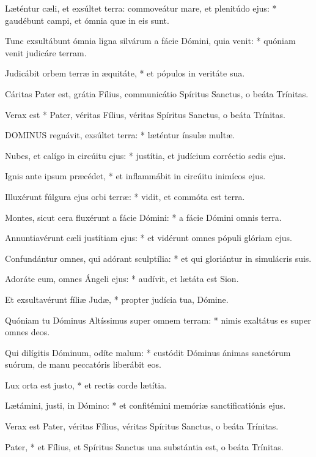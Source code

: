 Læténtur cæli, et exsúltet terra: commoveátur mare, et plenitúdo ejus: * gaudébunt campi, et ómnia quæ in eis sunt.

Tunc exsultábunt ómnia ligna silvárum a fácie Dómini, quia venit: * quóniam venit judicáre terram.

Judicábit orbem terræ in æquitáte, * et pópulos in veritáte sua.

 Cáritas Pater est, grátia Fílius, communicátio Spíritus Sanctus, o beáta Trínitas.

 Verax est * Pater, véritas Fílius, véritas Spíritus Sanctus, o beáta Trínitas.


\lettrine[lines=2]{D}{OMINUS} regnávit, exsúltet terra: * læténtur ínsulæ multæ.

Nubes, et calígo in circúitu ejus: * justítia, et judícium corréctio sedis ejus.

Ignis ante ipsum præcédet, * et inflammábit in circúitu inimícos ejus.

Illuxérunt fúlgura ejus orbi terræ: * vidit, et commóta est terra.

Montes, sicut cera fluxérunt a fácie Dómini: * a fácie Dómini omnis terra.

Annuntiavérunt cæli justítiam ejus: * et vidérunt omnes pópuli glóriam ejus.

Confundántur omnes, qui adórant sculptília: * et qui gloriántur in simulácris suis.

Adoráte eum, omnes Ángeli ejus: * audívit, et lætáta est Sion.

Et exsultavérunt fíliæ Judæ, * propter judícia tua, Dómine.

Quóniam tu Dóminus Altíssimus super omnem terram: * nimis exaltátus es super omnes deos.

Qui dilígitis Dóminum, odíte malum: * custódit Dóminus ánimas sanctórum suórum, de manu peccatóris liberábit eos.

Lux orta est justo, * et rectis corde lætítia.

Lætámini, justi, in Dómino: * et confitémini memóriæ sanctificatiónis ejus.

 Verax est Pater, véritas Fílius, véritas Spíritus Sanctus, o beáta Trínitas.

 Pater, * et Fílius, et Spíritus Sanctus una substántia est, o beáta Trínitas.


